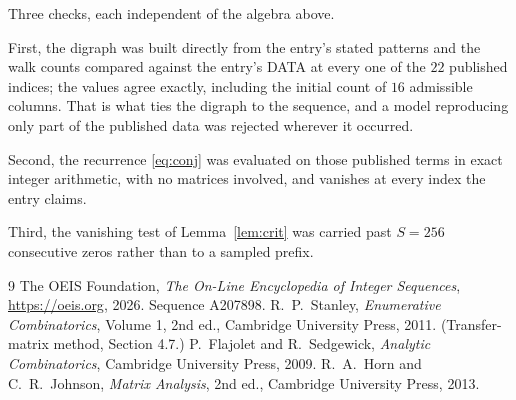 \documentclass[11pt,a4paper]{article}
\theoremstyle{plain}
\theoremstyle{definition}
\begin{document}
Three checks, each independent of the algebra above.

First, the digraph was built directly from the entry's stated patterns and the walk counts
compared against the entry's DATA at every one of the $22$ published indices; the
values agree exactly, including the initial count of $16$ admissible columns. That is
what ties the digraph to the sequence, and a model reproducing only part of the published
data was rejected wherever it occurred.

Second, the recurrence \eqref{eq:conj} was evaluated on those published terms in exact
integer arithmetic, with no matrices involved, and vanishes at every index the entry claims.

Third, the vanishing test of Lemma~\ref{lem:crit} was carried past $S=256$ consecutive
zeros rather than to a sampled prefix.

\begin{thebibliography}{9}
 The OEIS Foundation, \emph{The On-Line Encyclopedia of Integer
Sequences}, \url{https://oeis.org}, 2026. Sequence A207898.
 R.~P.~Stanley, \emph{Enumerative Combinatorics}, Volume 1, 2nd ed.,
Cambridge University Press, 2011. (Transfer-matrix method, Section 4.7.)
 P.~Flajolet and R.~Sedgewick, \emph{Analytic Combinatorics}, Cambridge
University Press, 2009.
 R.~A.~Horn and C.~R.~Johnson, \emph{Matrix Analysis}, 2nd ed., Cambridge
University Press, 2013.
\end{thebibliography}
\end{document}
